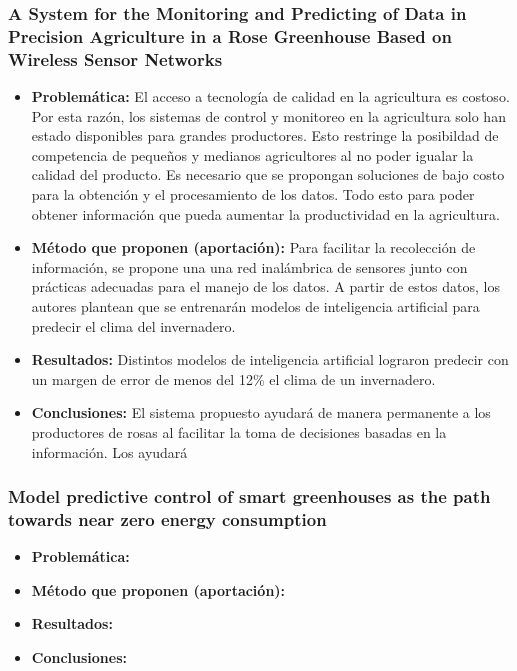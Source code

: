 \documentclass[final,12pt]{article}
\begin{document}
\subsubsection{A System for the Monitoring and Predicting of Data in Precision Agriculture in a Rose Greenhouse Based on Wireless Sensor Networks}
\begin{itemize}
    \item \textbf{Problemática: }
    El acceso a tecnología de calidad en la agricultura es costoso. Por esta razón, los sistemas de control y monitoreo en la agricultura 
	solo han estado disponibles para grandes productores. Esto restringe la posibildad de competencia de pequeños y medianos agricultores 
	al no poder igualar la calidad del producto. Es necesario que se propongan soluciones de bajo costo para la obtención y el procesamiento 
	de los datos. Todo esto para poder obtener información que pueda aumentar la productividad en la agricultura.
    \item \textbf{Método que proponen (aportación): } Para facilitar la recolección de información, se propone una una red inalámbrica de 
	sensores junto con prácticas adecuadas para el manejo de los datos. A partir de estos datos, los autores plantean que se entrenarán 
	modelos de inteligencia artificial para predecir el clima del invernadero. 
    \item \textbf{Resultados:}
    Distintos modelos de inteligencia artificial lograron predecir con un margen de error de menos del 12\% el clima de un invernadero.
    \item \textbf{Conclusiones:} El sistema propuesto ayudará de manera permanente a los productores de rosas al facilitar la toma de decisiones basadas en la información. Los ayudará 
\end{itemize}

\subsubsection{Model predictive control of smart greenhouses as the path towards near zero energy consumption}
\begin{itemize}
    \item \textbf{Problemática: }
    \item \textbf{Método que proponen (aportación): }
    \item \textbf{Resultados: }
    \item \textbf{Conclusiones:}
\end{itemize}
\end{document}
